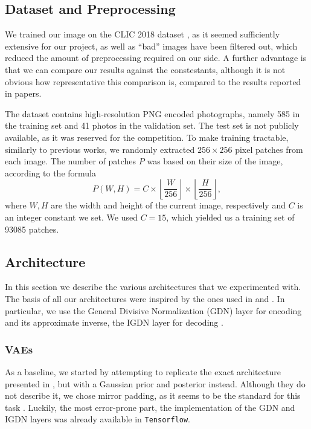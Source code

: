 \documentclass{article}
\begin{document}
\subsection{Dataset and Preprocessing}
\par
We trained our image on the CLIC 2018 dataset \cite{clic2018}, as it seemed
sufficiently extensive for our project, as well as ``bad'' images have been
filtered out, which reduced the amount of preprocessing required on our side.
A further advantage is that we can compare our results against the constestants,
although it is not obvious how representative this comparison is, compared to
the results reported in papers.
\par
The dataset contains high-resolution PNG encoded photographs, namely 585 in the
training set and 41 photos in the validation set. The test set is not
publicly available, as it was reserved for the competition. 
To make training tractable, similarly to previous works, we randomly extracted
$256 \times 256$ pixel patches from each image. The number of patches $P$ was
based on their size of the image, according to the formula
\[
  P(W, H) = C \times \left \lfloor \frac{W}{256} \right \rfloor \times
  \left \lfloor \frac{H}{256} \right \rfloor,
\]
where $W, H$ are the width and height of the current image, respectively and $C$
is an integer constant we set. We used $C = 15$, which yielded us a training set
of 93085 patches.
\subsection{Architecture}
\par
In this section we describe the various architectures that we experimented with.
The basis of all our architectures were inspired by the ones used in
\cite{balle2016end} and \cite{balle2018variational}. In particular, we use the
General Divisive Normalization (GDN) layer for encoding and its approximate
inverse, the IGDN layer for decoding \cite{balle2015density} \cite{balle2016end}.

\subsubsection{VAEs}
\par
As a baseline, we started by attempting to replicate the exact architecture
presented in \cite{balle2016end}, but with a Gaussian prior and posterior
instead. Although they do not describe it, we chose mirror padding, as it seems
to be the standard for this task \cite{theis2017lossy}. Luckily, the most
error-prone part, the implementation of the GDN and IGDN layers was already
available in \texttt{Tensorflow}\footnotemark.
\end{document}
